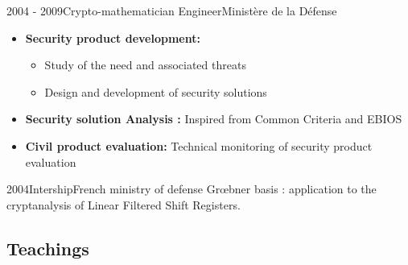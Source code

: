 \documentclass[a4paper]{customcv}
\begin{document}
\begin{cventry}{2004 - 2009}{Crypto-mathematician Engineer}{Ministère de la Défense}
  \begin{itemize}
    \item \textbf{Security product development:}
          \begin{itemize}
            \item Study of the need and associated threats
            \item Design and development of security solutions
          \end{itemize}
    \item \textbf{Security solution Analysis : }
          Inspired from Common Criteria and EBIOS
    \item \textbf{Civil product evaluation:} Technical monitoring of security product evaluation
  \end{itemize}
\end{cventry}

\begin{cventry}{2004}{Intership}{French ministry of defense}
  Gr\oe bner basis : application to the cryptanalysis of Linear Filtered Shift Registers.
\end{cventry}

\subsection{Teachings}
\end{document}
